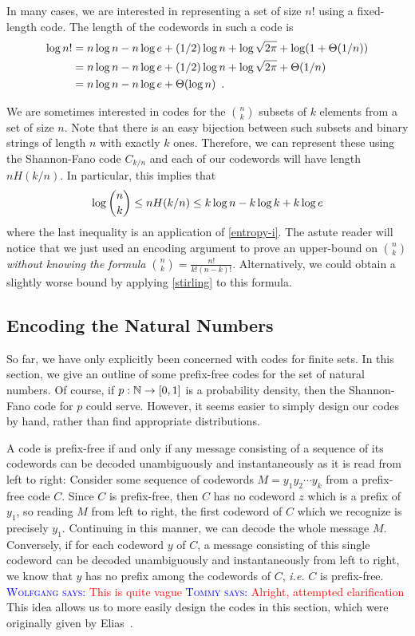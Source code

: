\documentclass{patmorin}
\newcommand{\aremark}[3]{\textcolor{blue}{\textsc{#1 #2:}}
  \textcolor{red}{\textsf{#3}}}
\newcommand{\tommy}[2][says]{\aremark{Tommy}{#1}{#2}}
\newcommand{\wolfgang}[2][says]{\aremark{Wolfgang}{#1}{#2}}
\begin{document}
In many cases, we are interested in representing a set of size $n!$
using a fixed-length code.  The length of the codewords in such a code
is
\begin{align}
  \log n!
  & = n\log n - n\log e + (1/2)\log n + \log \sqrt{2 \pi} + \log(1+\Theta(1/n)) \notag \\
  & = n\log n - n\log e + (1/2)\log n + \log \sqrt{2 \pi} + \Theta(1/n) \notag \\
  & = n\log n - n\log e + \Theta(\log n) \eqlabel{stirling-loose}
    \enspace .
\end{align}

We are sometimes interested in codes for the $\binom{n}{k}$ subsets of
$k$ elements from a set of size $n$. Note that there is an easy
bijection between such subsets and binary strings of length $n$ with
exactly $k$ ones. Therefore, we can represent these using the
Shannon-Fano code $C_{k/n}$ and each of our codewords will have length
$nH(k/n)$.  In particular, this implies that
\begin{equation}
  \log\binom{n}{k} \le nH(k/n) \le k\log n - k\log k + k\log e 
  \eqlabel{log-n-choose-k}
\end{equation}
where the last inequality is an application of \eqref{entropy-i}. The
astute reader will notice that we just used an encoding argument to
prove an upper-bound on $\binom{n}{k}$ \emph{without knowing the 
formula $\binom{n}{k}=\frac{n!}{k! (n - k)!}$}. Alternatively, we 
could obtain a slightly worse bound by applying 
\eqref{stirling} to this formula.

\subsection{Encoding the Natural Numbers}

So far, we have only explicitly been concerned with codes for finite
sets. In this section, we give an outline of some
prefix-free codes for the set of natural numbers. Of course, if $p :
\mathbb{N} \to [0, 1]$ is a probability density, then the Shannon-Fano code
for $p$ could serve. However, it seems easier to simply design our
codes by hand, rather than find appropriate distributions.

A code is prefix-free if and only if any message consisting of a
sequence of its codewords can be decoded unambiguously and
instantaneously as it is read from left to right: Consider some
sequence of codewords $M = y_1 y_2 \cdots y_k$ from a prefix-free code
$C$. Since $C$ is prefix-free, then $C$ has no codeword $z$ which is a
prefix of $y_1$, so reading $M$ from left to right, the first codeword
of $C$ which we recognize is precisely $y_1$. Continuing in this
manner, we can decode the whole message $M$. Conversely, if for each
codeword $y$ of $C$, a message consisting of this single codeword can
be decoded unambiguously and instantaneously from left to right, we
know that $y$ has no prefix among the codewords of $C$, \emph{i.e.}
$C$ is prefix-free. \wolfgang{This is quite vague} \tommy{Alright,
  attempted clarification} This idea allows us to more easily design
the codes in this section, which were originally given by
Elias~\cite{elias:coding}.
\end{document}
